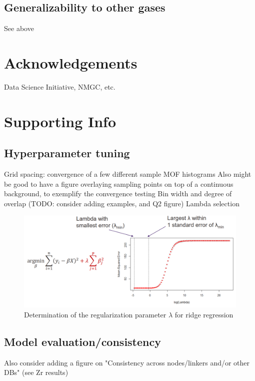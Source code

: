 \documentclass[letterpaper]{article}
\begin{document}
\subsection{Generalizability to other gases}
\begin{outline}
	\1 See above
\end{outline}


\section{Acknowledgements}
Data Science Initiative, NMGC, etc.


\pagebreak
\section{Supporting Info}

\subsection{Hyperparameter tuning}

\begin{outline}
	\1 Grid spacing: convergence of a few different sample MOF histograms
		\2 Also might be good to have a figure overlaying sampling points on top of a continuous background, to exemplify the convergence testing
	\1 Bin width and degree of overlap (TODO: consider adding examples, and Q2 figure)
	\1 Lambda selection
	\begin{figure}[!ht]
		\centering
		\includegraphics[width=0.75\columnwidth]{Figs/lambda.png}
		\caption{Determination of the regularization parameter $\lambda$ for ridge regression}
		\label{fig:lambda}
	\end{figure}
\end{outline}


\subsection{Model evaluation/consistency}

Also consider adding a figure on "Consistency across nodes/linkers and/or other DBs" (see Zr results)
\end{document}
